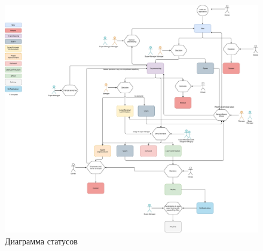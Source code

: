 \documentclass[a4paper,12pt,reqno]{article}
\begin{document}
	\newpage
	
	
	\newpage
	
	\begin{figure}[H]
		\centering
		\includegraphics[width = 0.9\linewidth]{img/statusflow.pdf}
		\caption{Диаграмма статусов}
		\label{pic: status}
	\end{figure}
	
	
	
	\newpage
	\listRegistration
	
\end{document}
